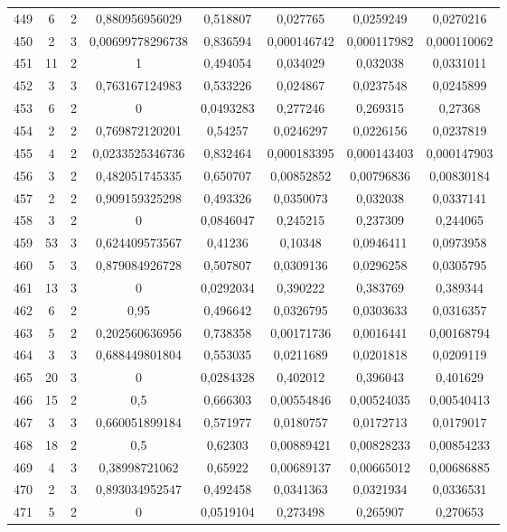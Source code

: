 \begin{longtable}{|c|c|c|c|c|c|c|c|}
449 & 6 & 2 & 0,880956956029 & 0,518807 & 0,027765 & 0,0259249 & 0,0270216  \\
450 & 2 & 3 & 0,00699778296738 & 0,836594 & 0,000146742 & 0,000117982 & 0,000110062  \\
451 & 11 & 2 & 1 & 0,494054 & 0,034029 & 0,032038 & 0,0331011  \\
452 & 3 & 3 & 0,763167124983 & 0,533226 & 0,024867 & 0,0237548 & 0,0245899  \\
453 & 6 & 2 & 0 & 0,0493283 & 0,277246 & 0,269315 & 0,27368  \\
454 & 2 & 2 & 0,769872120201 & 0,54257 & 0,0246297 & 0,0226156 & 0,0237819  \\
455 & 4 & 2 & 0,0233525346736 & 0,832464 & 0,000183395 & 0,000143403 & 0,000147903  \\
456 & 3 & 2 & 0,482051745335 & 0,650707 & 0,00852852 & 0,00796836 & 0,00830184  \\
457 & 2 & 2 & 0,909159325298 & 0,493326 & 0,0350073 & 0,032038 & 0,0337141  \\
458 & 3 & 2 & 0 & 0,0846047 & 0,245215 & 0,237309 & 0,244065  \\
459 & 53 & 3 & 0,624409573567 & 0,41236 & 0,10348 & 0,0946411 & 0,0973958  \\
460 & 5 & 3 & 0,879084926728 & 0,507807 & 0,0309136 & 0,0296258 & 0,0305795  \\
461 & 13 & 3 & 0 & 0,0292034 & 0,390222 & 0,383769 & 0,389344  \\
462 & 6 & 2 & 0,95 & 0,496642 & 0,0326795 & 0,0303633 & 0,0316357  \\
463 & 5 & 2 & 0,202560636956 & 0,738358 & 0,00171736 & 0,0016441 & 0,00168794  \\
464 & 3 & 3 & 0,688449801804 & 0,553035 & 0,0211689 & 0,0201818 & 0,0209119  \\
465 & 20 & 3 & 0 & 0,0284328 & 0,402012 & 0,396043 & 0,401629  \\
466 & 15 & 2 & 0,5 & 0,666303 & 0,00554846 & 0,00524035 & 0,00540413  \\
467 & 3 & 3 & 0,660051899184 & 0,571977 & 0,0180757 & 0,0172713 & 0,0179017  \\
468 & 18 & 2 & 0,5 & 0,62303 & 0,00889421 & 0,00828233 & 0,00854233  \\
469 & 4 & 3 & 0,38998721062 & 0,65922 & 0,00689137 & 0,00665012 & 0,00686885  \\
470 & 2 & 3 & 0,893034952547 & 0,492458 & 0,0341363 & 0,0321934 & 0,0336531  \\
471 & 5 & 2 & 0 & 0,0519104 & 0,273498 & 0,265907 & 0,270653  \\

\end{longtable}

